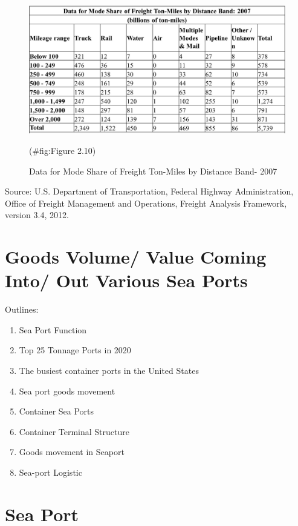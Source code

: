 \documentclass[
]{book}
\begin{document}
\begin{figure}

{\centering \includegraphics{./Images/Intro/Data for Mode Share of Freight Ton-Miles by Distance Band- 2007} 

}

\caption{Data for Mode Share of Freight Ton-Miles by Distance Band- 2007}(\#fig:Figure 2.10)
\end{figure}

Source: U.S. Department of Transportation, Federal Highway Administration, Office of Freight Management and Operations, Freight Analysis Framework, version 3.4, 2012.

\hypertarget{intro-Goods_Volume}{%
\section{Goods Volume/ Value Coming Into/ Out Various Sea Ports}\label{intro-Goods_Volume}}

Outlines:

\begin{enumerate}
\def\labelenumi{\arabic{enumi})}
\item
  Sea Port Function
\item
  Top 25 Tonnage Ports in 2020
\item
  The busiest container ports in the United States
\item
  Sea port goods movement
\item
  Container Sea Ports
\item
  Container Terminal Structure
\item
  Goods movement in Seaport
\item
  Sea-port Logistic
\end{enumerate}

\hypertarget{intro-Sea_Port_Function}{%
\section{Sea Port}\label{intro-Sea_Port_Function}}
\end{document}
